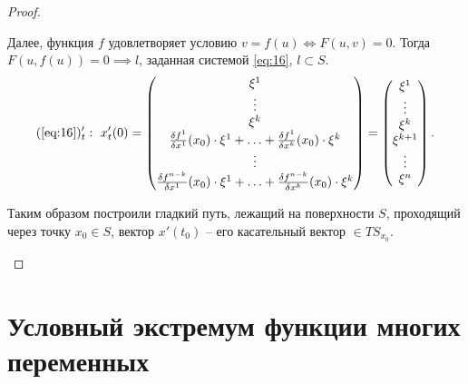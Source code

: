 \begin{proof}
\begin{enumerate}
              Далее, функция $f$ удовлетворяет условию $v = f(u) \iff F(u,v) = 0$. Тогда $F(u,f(u)) = 0\implies l$, заданная системой \ref{eq:16}, $l \subset S$.
              \[
                  (\text{\ref{eq:16}})_t': \ x_t'(0) = \left(\begin{matrix}
                          \xi^1                                                                                                  \\
                          \vdots                                                                                                 \\
                          \xi^k                                                                                                  \\
                          \frac{\delta f^1}{\delta x^1}(x_0)\cdot \xi^1 + \ldots + \frac{\delta f^1}{\delta x^k}(x_0)\cdot \xi^k \\
                          \vdots                                                                                                 \\
                          \frac{\delta f^{n-k}}{\delta x^1}(x_0)\cdot \xi^1 + \ldots + \frac{\delta f^{n-k}}{\delta x^k}(x_0)\cdot \xi^k
                      \end{matrix}\right) = \left(\begin{matrix}
                          \xi^1 \\ \vdots \\ \xi^k \\ \xi^{k+1} \\ \vdots \\ \xi^n
                      \end{matrix}\right).
              \]

              Таким образом построили гладкий путь, лежащий на поверхности $S$, проходящий через точку $x_0 \in S$, вектор $x'(t_0)$ -- его касательный вектор $\in TS_{x_0}$.
    \end{enumerate}
\end{proof}

\section{Условный экстремум функции многих переменных}

